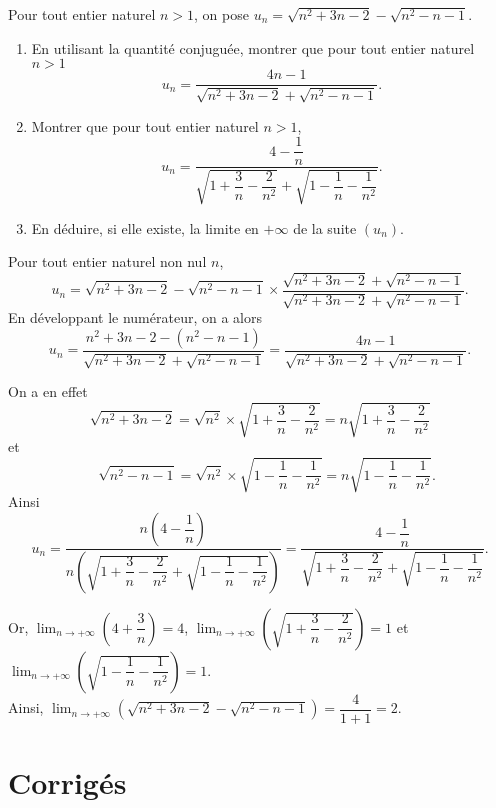 \documentclass[11pt,fleqn]{book} %
\begin{document}
\begin{exercise}Pour tout entier naturel $n>1$, on pose $ u_n = \sqrt{n^2+3n-2}-\sqrt{n^2-n-1}$.

\begin{enumerate}
\item En utilisant la quantité conjuguée, montrer que pour tout entier naturel $n>1$
\[ u_n=\dfrac{4n-1}{ \sqrt{n^2+3n-2}+\sqrt{n^2-n-1}}.\]
\item Montrer que pour tout entier naturel $n>1$, 
\[u_n = \dfrac{4-\dfrac{1}{n}}{\sqrt{1+\dfrac{3}{n}-\dfrac{2}{n^2}}+\sqrt{1-\dfrac{1}{n}-\dfrac{1}{n^2}}}.\]
\item En déduire, si elle existe, la limite en $+\infty$ de la suite $(u_n)$.
\end{enumerate}\end{exercise}
\begin{solution}Pour tout entier naturel non nul $n$,  
\[ u_n=  \sqrt{n^2+3n-2}-\sqrt{n^2-n-1} \times \dfrac{ \sqrt{n^2+3n-2}+\sqrt{n^2-n-1}}{ \sqrt{n^2+3n-2}+\sqrt{n^2-n-1}}.\]
En développant le numérateur, on a alors
\[u_n= \dfrac{n^2+3n-2-(n^2-n-1)}{ \sqrt{n^2+3n-2}+\sqrt{n^2-n-1}}=\dfrac{4n-1}{ \sqrt{n^2+3n-2}+\sqrt{n^2-n-1}}.\]

On a en effet \[\sqrt{n^2+3n-2}=\sqrt{n^2} \times \sqrt{1+\dfrac{3}{n}-\dfrac{2}{n^2}}=n\sqrt{1+\dfrac{3}{n}-\dfrac{2}{n^2}}\]
et
\[\quad\sqrt{n^2-n-1}=\sqrt{n^2} \times \sqrt{1-\dfrac{1}{n}-\dfrac{1}{n^2}}=n \sqrt{1-\dfrac{1}{n}-\dfrac{1}{n^2}}.\]
Ainsi
\[u_n=\dfrac{n\left(4-\dfrac{1}{n}\right)}{n\left(\sqrt{1+\dfrac{3}{n}-\dfrac{2}{n^2}}+\sqrt{1-\dfrac{1}{n}-\dfrac{1}{n^2}}\right)} = \dfrac{4-\dfrac{1}{n}}{\sqrt{1+\dfrac{3}{n}-\dfrac{2}{n^2}}+\sqrt{1-\dfrac{1}{n}-\dfrac{1}{n^2}}}.\]

Or,  $\displaystyle \lim_{n \to +\infty}\left(4+\dfrac{3}{n}\right)=4$,   $\displaystyle \lim_{n \to +\infty} \left(\sqrt{1+\dfrac{3}{n}-\dfrac{2}{n^2}}\right)=1$ et $\displaystyle \lim_{n \to +\infty}\left(\sqrt{1-\dfrac{1}{n}-\dfrac{1}{n^2}}\right)=1$.\\ Ainsi,  $\displaystyle \lim_{n \to +\infty} \left(\sqrt{n^2+3n-2}-\sqrt{n^2-n-1}\right)=\dfrac{4}{1+1}=2$.\end{solution}



\chapter{Corrigés}
\setcounter{section}{0}

\printsolutions[headings={false} ]
\end{document}
